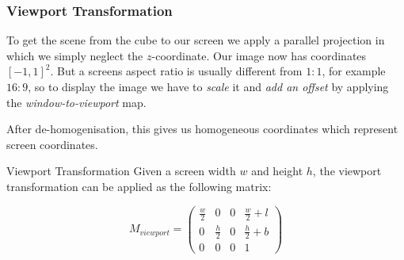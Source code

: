 \documentclass{panikzettel}
\begin{document}
\begin{center}
\end{center}

\subsubsection*{Viewport Transformation}

\begin{halfboxl}
To get the scene from the cube to our screen we apply a parallel projection in which we simply neglect the $z$-coordinate. Our image now has coordinates $[-1, 1]^2$. But a screens aspect ratio is usually different from $1:1$, for example $16:9$, so to display the image we have to \emph{scale} it and \emph{add an offset} by applying the \emph{window-to-viewport} map.

After de-homogenisation, this gives us homogeneous coordinates which represent screen coordinates.
\end{halfboxl}%
\begin{halfboxr}
\vspace{-\baselineskip}
\begin{defi}{Viewport Transformation}
Given a screen width $w$ and height $h$, the viewport transformation can be applied as the following matrix:

$$M_{viewport} = \begin{pmatrix}
\frac{w}{2} & 0 & 0 & \frac{w}{2} + l \\
0 & \frac{h}{2} & 0 & \frac{h}{2} + b \\
0 & 0 & 0 & 1
\end{pmatrix}$$
\end{defi}
\end{halfboxr}
\end{document}
